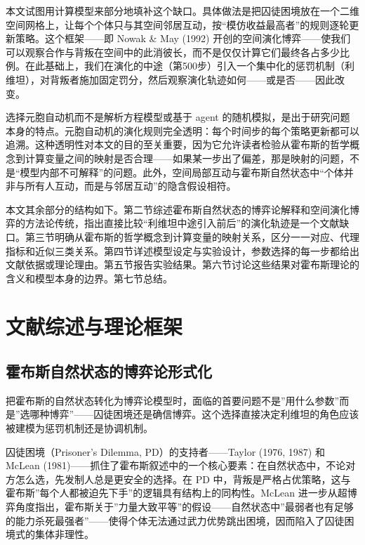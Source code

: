 \documentclass[12pt,a4paper]{ctexart}
\begin{document}
本文试图用计算模型来部分地填补这个缺口。具体做法是把囚徒困境放在一个二维空间网格上，让每个个体只与其空间邻居互动，按“模仿收益最高者”的规则逐轮更新策略。这个框架——即 Nowak \& May (1992) 开创的空间演化博弈——使我们可以观察合作与背叛在空间中的此消彼长，而不是仅仅计算它们最终各占多少比例。在此基础上，我们在演化的中途（第500步）引入一个集中化的惩罚机制（利维坦），对背叛者施加固定罚分，然后观察演化轨迹如何——或是否——因此改变。

选择元胞自动机而不是解析方程模型或基于 agent 的随机模拟，是出于研究问题本身的特点。元胞自动机的演化规则完全透明：每个时间步的每个策略更新都可以追溯。这种透明性对本文的目的至关重要，因为它允许读者检验从霍布斯的哲学概念到计算变量之间的映射是否合理——如果某一步出了偏差，那是映射的问题，不是“模型内部不可解释”的问题。此外，空间局部互动与霍布斯自然状态中“个体并非与所有人互动，而是与邻居互动”的隐含假设相符。

本文其余部分的结构如下。第二节综述霍布斯自然状态的博弈论解释和空间演化博弈的方法论传统，指出直接比较“利维坦中途引入前后”的演化轨迹是一个文献缺口。第三节明确从霍布斯的哲学概念到计算变量的映射关系，区分一一对应、代理指标和近似三类关系。第四节详述模型设定与实验设计，参数选择的每一步都给出文献依据或理论理由。第五节报告实验结果。第六节讨论这些结果对霍布斯理论的含义和模型本身的边界。第七节总结。

\section{文献综述与理论框架}

\subsection{霍布斯自然状态的博弈论形式化}

把霍布斯的自然状态转化为博弈论模型时，面临的首要问题不是”用什么参数”而是”选哪种博弈”——囚徒困境还是确信博弈。这个选择直接决定利维坦的角色应该被建模为惩罚机制还是协调机制。

囚徒困境（Prisoner's Dilemma, PD）的支持者——Taylor (1976, 1987) 和 McLean (1981)——抓住了霍布斯叙述中的一个核心要素：在自然状态中，不论对方怎么选，先发制人总是更安全的选择。在 PD 中，背叛是严格占优策略，这与霍布斯”每个人都被迫先下手”的逻辑具有结构上的同构性。McLean 进一步从超博弈角度指出，霍布斯关于”力量大致平等”的假设——自然状态中”最弱者也有足够的能力杀死最强者”——使得个体无法通过武力优势跳出困境，因而陷入了囚徒困境式的集体非理性。
\end{document}
